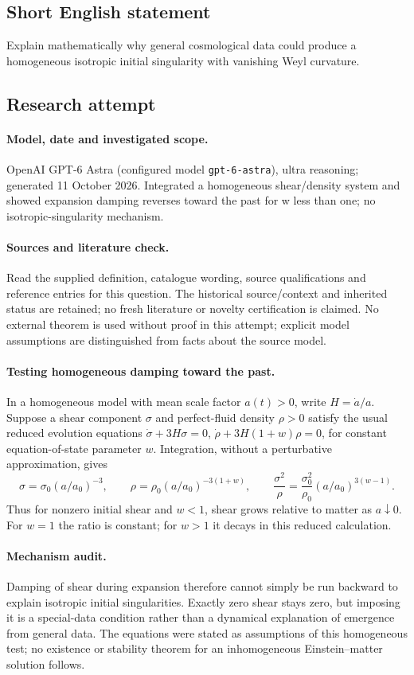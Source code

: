 \documentclass[11pt]{article}
\begin{document}
\subsection{Short English statement}
Explain mathematically why general cosmological data could produce a homogeneous isotropic initial singularity with vanishing Weyl curvature.
\subsection{Research attempt}
\paragraph{Model, date and investigated scope.}
OpenAI GPT-6 Astra (configured model \texttt{gpt-6-astra}), ultra reasoning; generated 11 October 2026. Integrated a homogeneous shear/density system and showed expansion damping reverses toward the past for w less than one; no isotropic-singularity mechanism.

\paragraph{Sources and literature check.}
Read the supplied definition, catalogue wording, source qualifications and reference entries for this question. The historical source/context and inherited status are retained; no fresh literature or novelty certification is claimed. No external theorem is used without proof in this attempt; explicit model assumptions are distinguished from facts about the source model.

\paragraph{Testing homogeneous damping toward the past.} In a homogeneous model with mean scale factor \(a(t)>0\), write \(H=\dot a/a\). Suppose a shear component \(\sigma\) and perfect-fluid density \(\rho>0\) satisfy the usual reduced evolution equations \(\dot\sigma+3H\sigma=0\), \(\dot\rho+3H(1+w)\rho=0\), for constant equation-of-state parameter \(w\). Integration, without a perturbative approximation, gives
\[
 \sigma=\sigma_0(a/a_0)^{-3},\qquad
 \rho=\rho_0(a/a_0)^{-3(1+w)},\qquad
 \frac{\sigma^2}{\rho}=\frac{\sigma_0^2}{\rho_0}(a/a_0)^{3(w-1)}.
\]
Thus for nonzero initial shear and \(w<1\), shear grows relative to matter as \(a\downarrow0\). For \(w=1\) the ratio is constant; for \(w>1\) it decays in this reduced calculation.
\paragraph{Mechanism audit.} Damping of shear during expansion therefore cannot simply be run backward to explain isotropic initial singularities. Exactly zero shear stays zero, but imposing it is a special-data condition rather than a dynamical explanation of emergence from general data. The equations were stated as assumptions of this homogeneous test; no existence or stability theorem for an inhomogeneous Einstein--matter solution follows.
\end{document}
